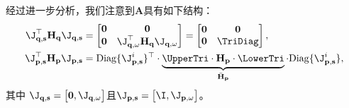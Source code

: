 
经过进一步分析，我们注意到$\mathbf{A}$具有如下结构：
\begin{equation}
  \begin{aligned}
    \J_{\mathbf{q, s}}^{\top} \mathbf{H}_{\mathbf{q}} \J_{\mathbf{q, s}} & =
    \begin{bmatrix}
      \mathbf{0} & \mathbf{0}                                                                   \\
      \mathbf{0} & \J_{\mathbf{q, \omega}}^{\top}\mathbf{H}_{\mathbf{q}}\J_{\mathbf{q, \omega}}
    \end{bmatrix} =
    \begin{bmatrix}
      \mathbf{0} & \mathbf{0} \\
      \mathbf{0} & \TriDiag
    \end{bmatrix}
    ,                                                                        \\
    \J^{\top}_{\mathbf{p, s}} \mathbf{H}_{\mathbf{p}} \J_{\mathbf{p, s}} & =
    \mathrm{Diag}\{\J^{i}_{\mathbf{p,s}}\}^{\top} \cdot
    \underbrace{
    \UpperTri \cdot \mathbf{H}_{\mathbf{p}}\cdot \LowerTri}_{\bar{\mathbf{H}}_{\mathbf{p}}}
    \cdot \mathrm{Diag}\{\J^{i}_{\mathbf{p,s}}\},
  \end{aligned}
  \label{eq:JTHJ}
\end{equation} 其中
$\J_{\mathbf{q, s}} =
  \begin{bmatrix}
    \mathbf{0}, \J_{\mathbf{q,\omega}}
  \end{bmatrix}
$且$\J_{\mathbf{p, s}} =
  \begin{bmatrix}
    \I, \J_{\mathbf{p, \omega}}
  \end{bmatrix}$。

